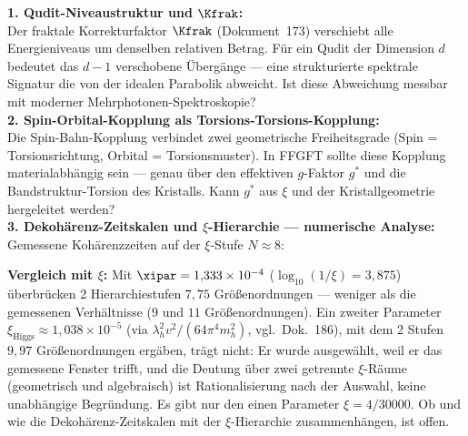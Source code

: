\begin{significance}
\textbf{1. Qudit-Niveaustruktur und $\Kfrak$:}\\
Der fraktale Korrekturfaktor $\Kfrak$ (Dokument~173)
verschiebt alle Energieniveaus um denselben relativen Betrag.
Für ein Qudit der Dimension $d$ bedeutet das
$d-1$ verschobene Übergänge --- eine strukturierte
spektrale Signatur die von der idealen Parabolik abweicht.
Ist diese Abweichung messbar mit moderner
Mehrphotonen-Spektroskopie?\\[6pt]

\textbf{2. Spin-Orbital-Kopplung als Torsions-Torsions-Kopplung:}\\
Die Spin-Bahn-Kopplung verbindet zwei geometrische
Freiheitsgrade (Spin = Torsionsrichtung,
Orbital = Torsionsmuster). In FFGFT sollte diese
Kopplung materialabhängig sein --- genau über den
effektiven $g$-Faktor $g^*$ und die
Bandstruktur-Torsion des Kristalls.
Kann $g^*$ aus $\xi$ und der Kristallgeometrie
hergeleitet werden?\\[6pt]

\textbf{3. Dekohärenz-Zeitskalen und $\xi$-Hierarchie --- numerische Analyse:}\\
Gemessene Kohärenzzeiten auf der $\xi$-Stufe $N \approx 8$:
\begin{center}
{\footnotesize
{}
} %
\end{center}

\textbf{Vergleich mit $\xi$:} Mit $\xipar = 1{,}333\times10^{-4}$ ($\log_{10}(1/\xi) = 3{,}875$) überbrücken 2 Hierarchiestufen $7{,}75$ Größenordnungen --- weniger als die gemessenen Verhältnisse ($9$ und $11$ Größenordnungen).
Ein zweiter Parameter $\xi_\text{Higgs} \approx 1{,}038\times10^{-5}$ (via $\lambda_h^2 v^2/(64\pi^4 m_h^2)$, vgl.\ Dok.~186), mit dem 2 Stufen $9{,}97$ Größenordnungen ergäben, trägt nicht: Er wurde ausgewählt, weil er das gemessene Fenster trifft, und die Deutung über zwei getrennte $\xi$-Räume (geometrisch und algebraisch) ist Rationalisierung nach der Auswahl, keine unabhängige Begründung. Es gibt nur den einen Parameter $\xi = 4/30000$.
Ob und wie die Dekohärenz-Zeitskalen mit der $\xi$-Hierarchie zusammenhängen, ist offen.\\[6pt]


\end{significance}
